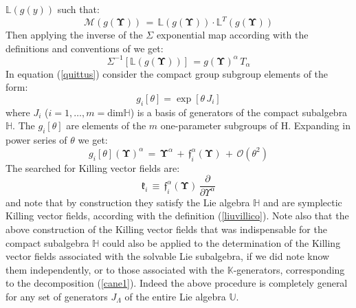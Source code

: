 \documentclass[10pt,a4paper]{article}
\begin{document}
$\mathbb{L}\left(g\left(y\right)\right)$ such that:
\begin{equation}\label{fioridizucca}
  \mathcal{M}\left(g\left(\boldsymbol{\Upsilon}\right)\right)\, = \, \mathbb{L}\left(g\left(\boldsymbol{\Upsilon}\right)\right)\cdot\mathbb{L}^T\left(g\left(\boldsymbol{\Upsilon}\right)\right)
\end{equation}
Then applying the inverse of the $\Sigma$ exponential map according with the definitions and conventions of
\cite{pgtstheory,TSnaviga} we get:
\begin{equation}\label{quittus}
  \Sigma^{-1}\left[\mathbb{L}\left(g\left(\boldsymbol{\Upsilon}\right)\right)\right] \, = g\left(\boldsymbol{\Upsilon}\right)^\alpha\, T_\alpha
\end{equation}
In equation (\ref{quittus}) consider the compact group subgroup elements of the form:
\begin{equation}\label{pergolatorotto}
  g_i[\theta]=\exp\left[\theta \, J_i \right]
\end{equation}
where $J_i$ ($i=1,\dots, m=\text{dim}\mathbb{H}$) is a basis of generators of the compact subalgebra $\mathbb{H}$.
The $g_i[\theta]$ are elements of the $m$ one-parameter subgroups of $\mathrm{H}$.
Expanding in power series of $\theta$ we get:
\begin{equation}\label{caramellina}
  g_i[\theta]\left(\boldsymbol{\Upsilon}\right)^\alpha\, = \, \boldsymbol{\Upsilon}^\alpha \, + \, \mathfrak{f}_i^\alpha (\boldsymbol{\Upsilon}) \, + \,\mathcal{ O}(\theta^2)
\end{equation}
The searched for Killing vector fields are:
\begin{equation}\label{transeunte}
  \boldsymbol{\mathfrak{k}}_i \, \equiv \, \mathfrak{f}_i^\alpha (\boldsymbol{\Upsilon}) \, \frac{\partial}{\partial \Upsilon^\alpha}
\end{equation}
and note that by construction  they satisfy the Lie algebra $\mathbb{H}$ and are symplectic Killing vector fields, according with the definition (\ref{liuvillico}). Note also that the above construction of the Killing vector fields that was indispensable for the compact subalgebra $\mathbb{H}$ could also be applied to the determination of the Killing vector fields associated with the solvable Lie subalgebra, if we did note know them independently, or to those associated with the $\mathbb{K}$-generators, corresponding to the decomposition (\ref{cane1}). Indeed the above procedure is completely general for any set of generators $J_\Lambda$ of the entire Lie algebra $\mathbb{U}$.
\end{document}
